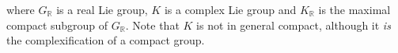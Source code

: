 \begin{remark}
\begin{center}
\end{center}
\noindent where $G_\mathbb{R}$ is a real Lie group, $K$ is a complex Lie group and $K_\mathbb{R}$ is the maximal compact subgroup of $G_\mathbb{R}$. Note that $K$ is not in general compact, although it {\em is} the complexification of a compact group.\\
\end{remark}




